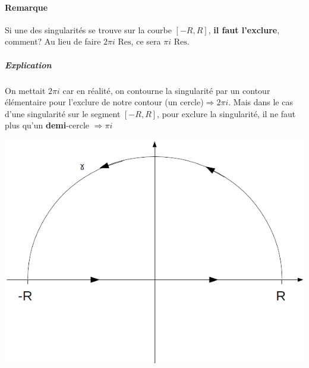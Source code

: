 \paragraph{Remarque} Si une des singularités se trouve sur la courbe $[-R,R]$, \textbf{il faut l'exclure}, comment? Au lieu de faire $2\pi i\text{ Res}$, ce sera $\pi i\text{ Res}$.\subparagraph{Explication} On mettait $2\pi i$ car en réalité, on contourne la singularité par un contour élémentaire pour l'exclure de notre contour (un cercle)$\Rightarrow 2\pi i$. Mais dans le cas d'une singularité sur le segment $[-R,R]$, pour exclure la singularité, il ne faut plus qu’un \textbf{demi}-cercle $\Rightarrow \pi i$
\begin{center}
\includegraphics[scale=0.5]{test2}
\label{fig::p}
\end{center}

